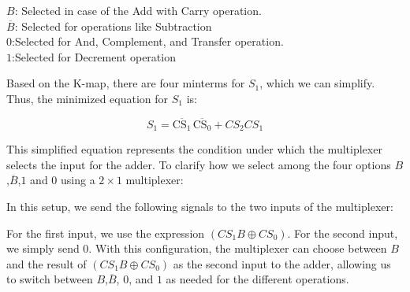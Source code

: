 \documentclass{article}
\begin{document}
$B$: Selected in case of the  Add with Carry operation.\\
$\overline{B}$: Selected for operations like Subtraction
\\$0$:Selected for And, Complement, and Transfer operation.
\\$1$:Selected for Decrement operation\\
\begin{center}
\end{center}
Based on the K-map, there are four minterms for $S_1$, which we can simplify. Thus, the minimized equation for $S_1$ is:

\begin{center}
    $$
        S_1 = \overline{\text{CS}_1} \, \overline{\text{CS}_0}+CS_2CS_1
    $$
\end{center}
This simplified equation represents the condition under which the multiplexer selects the input for the adder. To clarify how we select among the four options $B$,$\overline{B}$,$1$ and $0$ using a $2 \times 1$ multiplexer:

In this setup, we send the following signals to the two inputs of the multiplexer:

For the first input, we use the expression  $({CS}_1B \oplus {CS}_0 )$. 
For the second input, we simply send $0$.
With this configuration, the multiplexer can choose between $B$ and the result of $({CS}_1B \oplus {CS}_0 )$ as the second input to the adder, allowing us to switch between $B$,$\overline{B}$, $0$, and $1$ as needed for the different operations.
\end{document}
